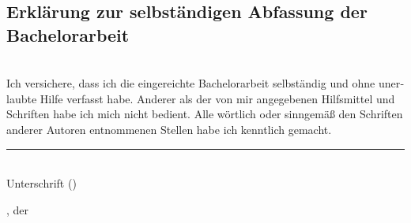 \begin{otherlanguage}{ngerman}
    \section*{Erklärung zur selbständigen Abfassung der Bachelorarbeit}

    \vspace{5cm}

    ~\\
    Ich versichere, dass ich die eingereichte Bachelorarbeit selbständig und ohne unerlaubte
    Hilfe verfasst habe. Anderer als der von mir angegebenen Hilfsmittel und Schriften habe
    ich mich nicht bedient. Alle wörtlich oder sinngemäß den Schriften anderer Autoren entnommenen
    Stellen habe ich kenntlich gemacht.

    \vspace{3cm}
    \begin{flushright}

        \rule{8cm}{0.2mm} \\
        Unterschrift (\myName)
    \end{flushright}

    \vspace{2cm}
    \place, der \submission{}
\end{otherlanguage}